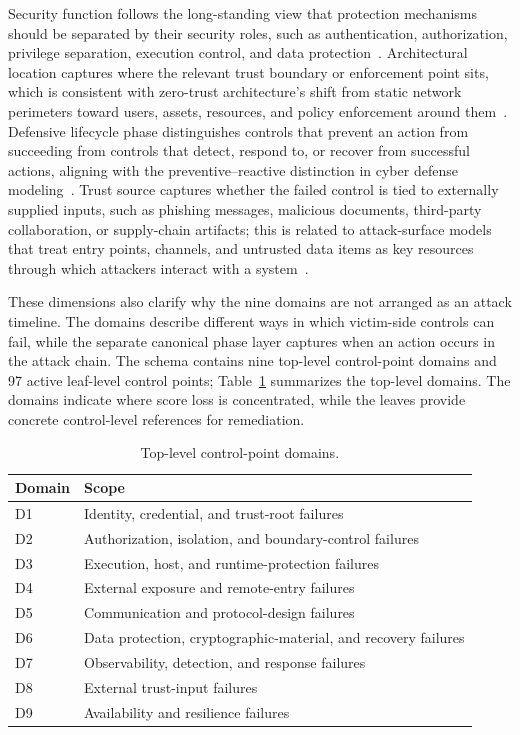Security function follows the long-standing view that protection mechanisms should be separated by their security roles, such as authentication, authorization, privilege separation, execution control, and data protection~\cite{saltzer1975}. Architectural location captures where the relevant trust boundary or enforcement point sits, which is consistent with zero-trust architecture's shift from static network perimeters toward users, assets, resources, and policy enforcement around them~\cite{nist800207}. Defensive lifecycle phase distinguishes controls that prevent an action from succeeding from controls that detect, respond to, or recover from successful actions, aligning with the preventive--reactive distinction in cyber defense modeling~\cite{zheng2018}. Trust source captures whether the failed control is tied to externally supplied inputs, such as phishing messages, malicious documents, third-party collaboration, or supply-chain artifacts; this is related to attack-surface models that treat entry points, channels, and untrusted data items as key resources through which attackers interact with a system~\cite{manadhata2011}.

These dimensions also clarify why the nine domains are not arranged as an attack timeline. The domains describe different ways in which victim-side controls can fail, while the separate canonical phase layer captures when an action occurs in the attack chain. The schema contains nine top-level control-point domains and 97 active leaf-level control points; Table~\ref{tab:control-point-domains} summarizes the top-level domains. The domains indicate where score loss is concentrated, while the leaves provide concrete control-level references for remediation.

\begin{table}[t]
\centering
\caption{Top-level control-point domains.}
\label{tab:control-point-domains}
\begin{tabular}{p{}p{}}
\hline
Domain & Scope \\
\hline
D1 & Identity, credential, and trust-root failures \\
D2 & Authorization, isolation, and boundary-control failures \\
D3 & Execution, host, and runtime-protection failures \\
D4 & External exposure and remote-entry failures \\
D5 & Communication and protocol-design failures \\
D6 & Data protection, cryptographic-material, and recovery failures \\
D7 & Observability, detection, and response failures \\
D8 & External trust-input failures \\
D9 & Availability and resilience failures \\
\hline
\end{tabular}
\end{table}

